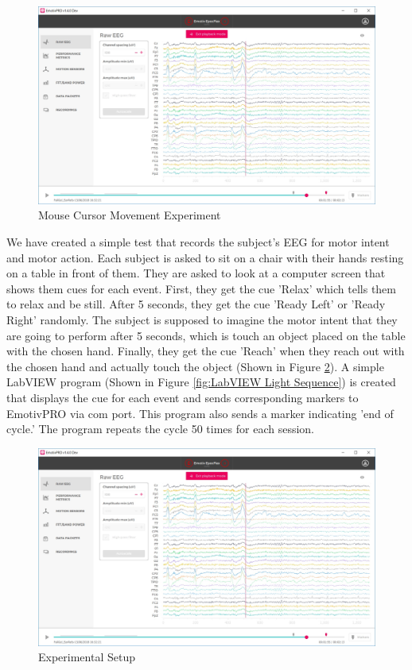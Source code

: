 \documentclass{article}
\begin{document}
\begin{figure}[tbp]
    \centering
    \includegraphics[scale=0.3]{Images/EmotivPRO-Markers.jpg}
    \caption{Mouse Cursor Movement Experiment}
    \label{fig:EmotivPRO with Markers}
\end{figure}

We have created a simple test that records the subject's EEG for motor intent and motor action. Each subject is asked to sit on a chair with their hands resting on a table in front of them. They are asked to look at a computer screen that shows them cues for each event. First, they get the cue 'Relax' which tells them to relax and be still. After 5 seconds, they get the cue 'Ready Left' or 'Ready Right' randomly. The subject is supposed to imagine the motor intent that they are going to perform after 5 seconds, which is touch an object placed on the table with the chosen hand. Finally, they get the cue 'Reach' when they reach out with the chosen hand and actually touch the object (Shown in Figure \ref{fig:Experimental Setup}). A simple LabVIEW program (Shown in Figure \ref{fig:LabVIEW Light Sequence}) is created that displays the cue for each event and sends corresponding markers to EmotivPRO via com port. This program also sends a marker indicating 'end of cycle.' The program repeats the cycle 50 times for each session.

\begin{figure}[tbp]
    \centering
    \includegraphics[scale=0.3]{Images/EmotivPRO-Markers.jpg}
    \caption{Experimental Setup}
    \label{fig:Experimental Setup}
\end{figure}
\end{document}
